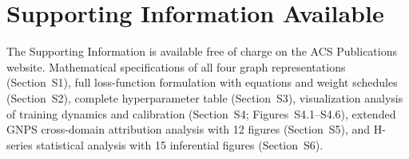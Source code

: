 \documentclass[journal=jcisd8]{achemso}
\begin{document}
\section*{Supporting Information Available}
\noindent The Supporting Information is available free of charge on the ACS Publications website.
Mathematical specifications of all four graph representations
(Section~S1), full loss-function formulation with equations and weight
schedules (Section~S2), complete hyperparameter table (Section~S3),
visualization analysis of training dynamics and calibration
(Section~S4; Figures~S4.1--S4.6), extended GNPS cross-domain attribution
analysis with 12 figures (Section~S5), and H-series statistical
analysis with 15 inferential figures (Section~S6).
\end{document}

